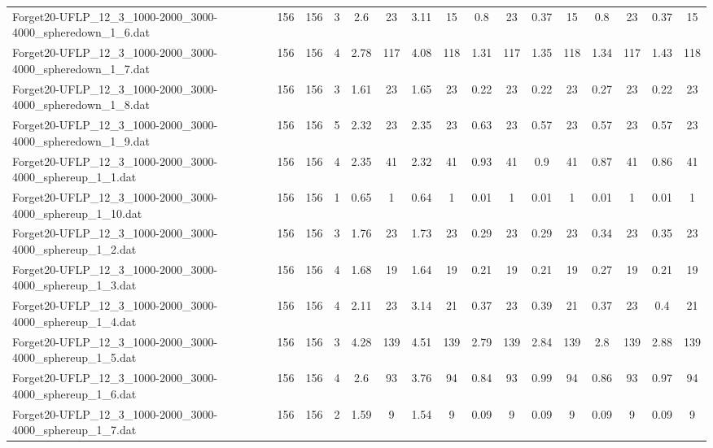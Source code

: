 \begin{sidewaystable}[!ht]
{\begin{tabular}{lccccccccccccccc}
Forget20-UFLP\_12\_3\_1000-2000\_3000-4000\_spheredown\_1\_6.dat & 156 & 156 & 3 & 2.6 & 23 & 3.11 & 15 & 0.8 & 23 &  \textcolor{blue2}{0.37} & 15 & 0.8 & 23 &  \textcolor{blue2}{0.37} & 15 \\
Forget20-UFLP\_12\_3\_1000-2000\_3000-4000\_spheredown\_1\_7.dat & 156 & 156 & 4 & 2.78 & 117 & 4.08 & 118 & 1.31 & 117 & 1.35 & 118 & 1.34 & 117 & 1.43 & 118 \\
Forget20-UFLP\_12\_3\_1000-2000\_3000-4000\_spheredown\_1\_8.dat & 156 & 156 & 3 & 1.61 & 23 & 1.65 & 23 &  \textcolor{blue2}{0.22} & 23 &  \textcolor{blue2}{0.22} & 23 & 0.27 & 23 &  \textcolor{blue2}{0.22} & 23 \\
Forget20-UFLP\_12\_3\_1000-2000\_3000-4000\_spheredown\_1\_9.dat & 156 & 156 & 5 & 2.32 & 23 & 2.35 & 23 & 0.63 & 23 &  \textcolor{blue2}{0.57} & 23 &  \textcolor{blue2}{0.57} & 23 &  \textcolor{blue2}{0.57} & 23 \\
Forget20-UFLP\_12\_3\_1000-2000\_3000-4000\_sphereup\_1\_1.dat & 156 & 156 & 4 & 2.35 & 41 & 2.32 & 41 & 0.93 & 41 & 0.9 & 41 & 0.87 & 41 &  \textcolor{blue2}{0.86} & 41 \\
Forget20-UFLP\_12\_3\_1000-2000\_3000-4000\_sphereup\_1\_10.dat & 156 & 156 & 1 & 0.65 & 1 & 0.64 & 1 &  \textcolor{blue2}{0.01} & 1 &  \textcolor{blue2}{0.01} & 1 &  \textcolor{blue2}{0.01} & 1 &  \textcolor{blue2}{0.01} & 1 \\
Forget20-UFLP\_12\_3\_1000-2000\_3000-4000\_sphereup\_1\_2.dat & 156 & 156 & 3 & 1.76 & 23 & 1.73 & 23 & 0.29 & 23 & 0.29 & 23 & 0.34 & 23 & 0.35 & 23 \\
Forget20-UFLP\_12\_3\_1000-2000\_3000-4000\_sphereup\_1\_3.dat & 156 & 156 & 4 & 1.68 & 19 & 1.64 & 19 &  \textcolor{blue2}{0.21} & 19 &  \textcolor{blue2}{0.21} & 19 & 0.27 & 19 &  \textcolor{blue2}{0.21} & 19 \\
Forget20-UFLP\_12\_3\_1000-2000\_3000-4000\_sphereup\_1\_4.dat & 156 & 156 & 4 & 2.11 & 23 & 3.14 & 21 &  \textcolor{blue2}{0.37} & 23 & 0.39 & 21 &  \textcolor{blue2}{0.37} & 23 & 0.4 & 21 \\
Forget20-UFLP\_12\_3\_1000-2000\_3000-4000\_sphereup\_1\_5.dat & 156 & 156 & 3 & 4.28 & 139 & 4.51 & 139 & 2.79 & 139 & 2.84 & 139 & 2.8 & 139 & 2.88 & 139 \\
Forget20-UFLP\_12\_3\_1000-2000\_3000-4000\_sphereup\_1\_6.dat & 156 & 156 & 4 & 2.6 & 93 & 3.76 & 94 & 0.84 & 93 & 0.99 & 94 & 0.86 & 93 & 0.97 & 94 \\
Forget20-UFLP\_12\_3\_1000-2000\_3000-4000\_sphereup\_1\_7.dat & 156 & 156 & 2 & 1.59 & 9 & 1.54 & 9 & 0.09 & 9 & 0.09 & 9 & 0.09 & 9 & 0.09 & 9 \\

\end{tabular}}
\end{sidewaystable}
